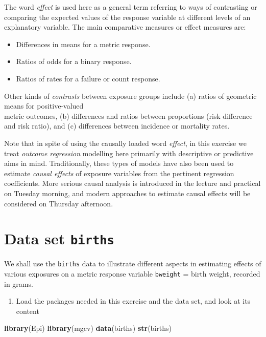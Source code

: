 \documentclass[
]{book}
\newenvironment{Shaded}{\begin{snugshade}}{\end{snugshade}}
\newcommand{\FunctionTok}[1]{\textcolor[rgb]{0.13,0.29,0.53}{\textbf{#1}}}
\newcommand{\NormalTok}[1]{#1}
\providecommand{\tightlist}{%
  \setlength{\itemsep}{0pt}\setlength{\parskip}{0pt}}
\theoremstyle{definition}
\theoremstyle{definition}
\theoremstyle{definition}
\theoremstyle{definition}
\theoremstyle{remark}
\begin{document}
The word \emph{effect}
is used here as a general term referring to ways of
contrasting or comparing the expected values of the response variable at
different levels of an explanatory
variable. The main comparative measures or effect measures are:

\begin{itemize}
\tightlist
\item
  Differences in means for a metric response.
\item
  Ratios of odds for a binary response.
\item
  Ratios of rates for a failure or count response.
\end{itemize}

Other kinds of \emph{contrasts} between exposure groups
include (a) ratios of geometric means for positive-valued\\
metric outcomes,
(b) differences and ratios between proportions
(risk difference and risk ratio), and (c)
differences between incidence or mortality rates.

Note that in spite of using the causally loaded word \emph{effect},
in this exercise we treat \emph{outcome regression} modelling
here primarily with descriptive or predictive aims in mind.
Traditionally, these types of models have also been used
to estimate \emph{causal effects} of exposure variables
from the pertinent regression coefficients.
More serious causal analysis is introduced in the lecture and practical
on Tuesday morning, and modern approaches
to estimate causal effects will be considered
on Thursday afternoon.

\section{\texorpdfstring{Data set \texttt{births}}{Data set births}}\label{data-set-births}

We shall use the \texttt{births} data to illustrate
different aspects in estimating effects of various exposures on a metric response variable
\texttt{bweight} = birth weight, recorded in grams.

\begin{enumerate}
\def\labelenumi{\arabic{enumi}.}
\tightlist
\item
  Load the packages needed in this exercise and the data set, and look at its content
\end{enumerate}

\begin{Shaded}
\begin{Highlighting}[]
\FunctionTok{library}\NormalTok{(Epi)}
\FunctionTok{library}\NormalTok{(mgcv)}
\FunctionTok{data}\NormalTok{(births)}
\FunctionTok{str}\NormalTok{(births)}
\end{Highlighting}
\end{Shaded}
\end{document}
